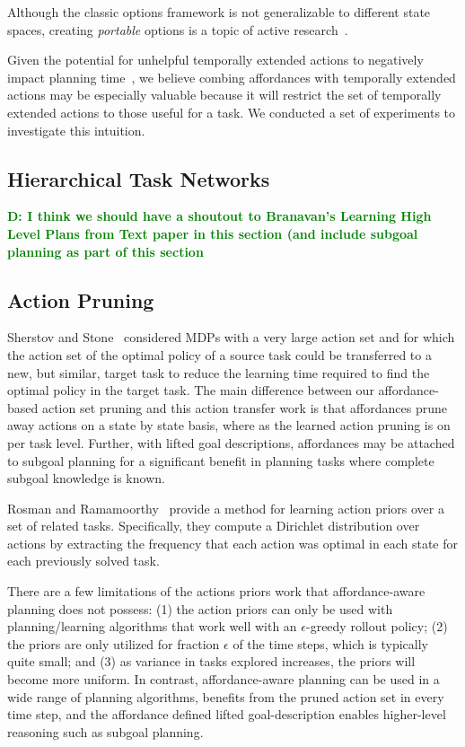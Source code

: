 \documentclass[conference]{IEEEtran}
\newcommand{\dnote}[1]{\textcolor{Green}{\textbf{D: #1}}}
\begin{document}
Although the classic options framework is not generalizable to different state spaces,
creating {\em portable} options is a topic of active research~\cite{konidaris07,konidaris2009efficient,Ravindran03analgebraic,croonenborghs2008learning,andre2002state,konidaris2012transfer}.

Given the potential for unhelpful temporally extended actions to negatively impact planning time~\cite{Jong:2008zr}, we believe combing affordances with temporally extended actions
may be especially valuable because it will restrict the set of temporally extended actions to those
useful for a task. We conducted a set of experiments to investigate this intuition.

\subsection{Hierarchical Task Networks}

\dnote{I think we should have a shoutout to Branavan's Learning High Level Plans from Text paper in this section (and include subgoal planning as part of this section}


\subsection{Action Pruning}

Sherstov and Stone~\cite{sherstov2005improving} considered MDPs with a very large action set and for which the action
set of the optimal policy of a source task could be transferred to a new, but similar, target
task to reduce the learning time required to find the optimal policy in the target task. The main difference between our affordance-based action set pruning and this action transfer
work is that affordances prune away actions on a state by state basis, where
as the learned action pruning is on per task level. Further, with lifted goal descriptions, affordances may be attached to subgoal planning for a significant
benefit in planning tasks where complete subgoal knowledge is known.

Rosman and Ramamoorthy~\cite{rosman2012good} provide a method for learning action priors over a set of related tasks. Specifically, they compute a Dirichlet distribution over actions by extracting the frequency that each action was optimal in each state for each previously solved task.

There are a few limitations of the actions priors work that affordance-aware planning does not possess: (1) the action priors can only be used with planning/learning algorithms that work well with an $\epsilon$-greedy rollout policy; (2) the priors are only utilized for fraction $\epsilon$ of the time steps, which is typically quite small; and (3) as variance in tasks explored increases, the priors will become more uniform. In contrast, affordance-aware planning can be used in a wide range of planning algorithms, benefits from the pruned action set in every time step, and the affordance defined lifted goal-description enables higher-level reasoning such as subgoal planning.
\end{document}
